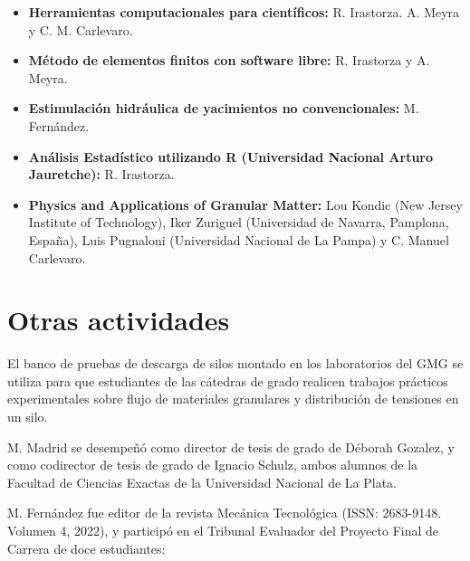 \documentclass[a4paper,11pt,twoside,final,titlepage,onecolumn,openright]{report}
\begin{document}
\begin{itemize}
 \item {\bf Herramientas computacionales para científicos:} R. Irastorza. A. Meyra y C. M. Carlevaro.
 \item \textbf{Método de elementos finitos con software libre:} R. Irastorza y A. Meyra.
 \item \textbf{Estimulación hidráulica de yacimientos no convencionales:} M. Fernández.
 \item {\bf Análisis Estadístico utilizando R (Universidad Nacional Arturo Jauretche):} R. Irastorza.
 \item \textbf{Physics and Applications of Granular Matter:} Lou Kondic (New Jersey Institute of Technology), Iker Zuriguel (Universidad de Navarra, Pamplona, España), Luis Pugnaloni (Universidad Nacional de La Pampa) y C. Manuel Carlevaro.

\end{itemize}

\section{Otras actividades}

El banco de pruebas de descarga de silos montado en los laboratorios del GMG se utiliza para que estudiantes de las cátedras de grado realicen trabajos prácticos experimentales sobre flujo de materiales granulares y distribución de tensiones en un silo. 

M. Madrid se desempeñó como director de tesis de grado de Déborah Gozalez, y como codirector de tesis de grado de Ignacio Schulz, ambos alumnos de la Facultad de Ciencias Exactas de la Universidad Nacional de La Plata.

M. Fernández fue editor de la revista Mecánica Tecnológica (ISSN: 2683-9148. Volumen 4, 2022), y participó en el Tribunal Evaluador del Proyecto Final de Carrera de doce estudiantes:  
\end{document}
